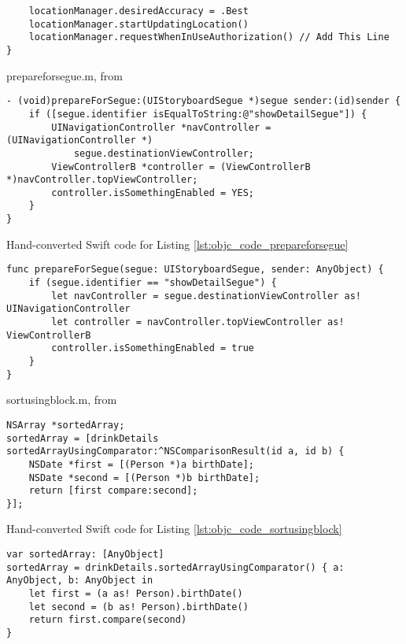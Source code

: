 \documentclass{sfuthesis}
\begin{document}
\begin{appendices}
\begin{listing}
\begin{verbatim}
    locationManager.desiredAccuracy = .Best
    locationManager.startUpdatingLocation()
    locationManager.requestWhenInUseAuthorization() // Add This Line
}
\end{verbatim}
\end{listing}

\begin{listing}
\caption{prepareforsegue.m, from \cite{so5210535}}
\label{lst:objc_code_prepareforsegue}
\begin{verbatim}
- (void)prepareForSegue:(UIStoryboardSegue *)segue sender:(id)sender {
    if ([segue.identifier isEqualToString:@"showDetailSegue"]) {
        UINavigationController *navController = (UINavigationController *)
            segue.destinationViewController;
        ViewControllerB *controller = (ViewControllerB *)navController.topViewController;
        controller.isSomethingEnabled = YES;
    }
}
\end{verbatim}
\end{listing}

\begin{listing}
\caption{Hand-converted Swift code for Listing \ref{lst:objc_code_prepareforsegue}}
\begin{verbatim}
func prepareForSegue(segue: UIStoryboardSegue, sender: AnyObject) {
    if (segue.identifier == "showDetailSegue") {
        let navController = segue.destinationViewController as! UINavigationController
        let controller = navController.topViewController as! ViewControllerB
        controller.isSomethingEnabled = true
    }
}
\end{verbatim}
\end{listing}

\begin{listing}
\caption{sortusingblock.m, from \cite{so805547}}
\label{lst:objc_code_sortusingblock}
\begin{verbatim}
NSArray *sortedArray;
sortedArray = [drinkDetails sortedArrayUsingComparator:^NSComparisonResult(id a, id b) {
    NSDate *first = [(Person *)a birthDate];
    NSDate *second = [(Person *)b birthDate];
    return [first compare:second];
}];
\end{verbatim}
\end{listing}

\begin{listing}
\caption{Hand-converted Swift code for Listing \ref{lst:objc_code_sortusingblock}}
\begin{verbatim}
var sortedArray: [AnyObject]
sortedArray = drinkDetails.sortedArrayUsingComparator() { a: AnyObject, b: AnyObject in
    let first = (a as! Person).birthDate()
    let second = (b as! Person).birthDate()
    return first.compare(second)
}
\end{verbatim}
\end{listing}


\end{appendices}
\end{document}
